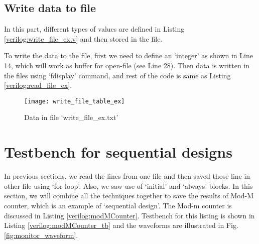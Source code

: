 \subsection{Write data to file}

In this part, different types of values are defined in Listing \ref{verilog:write_file_ex.v} and then stored in the file. 

\begin{explanation}
	To write the data to the file, first we need to define an `integer' as shown in Line 14, which will work as buffer for open-file (see Line 28). Then data is written in the files using `fdisplay' command, and rest of the code is same as Listing  \ref{verilog:read_file_ex}.  
\end{explanation}
%
%


%
\begin{figure}[!h]
	\centering
	\texttt{[image: write\_file\_table\_ex]}
	\caption{Data in file  `write\_file\_ex.txt'}
	\label{fig:write_file_table_ex}
\end{figure}

\section{Testbench for sequential designs}
In previous sections, we read the lines from one file and then saved those line in other file using `for loop'. Also, we saw use of `initial' and `always' blocks. In this section, we will combine all the techniques together to save the results of Mod-M counter, which is an example of `sequential design'. The Mod-m counter is discussed in Listing \ref{verilog:modMCounter}. Testbench for this listing is shown in Listing \ref{verilog:modMCounter_tb} and the waveforms are illustrated in Fig. \ref{fig:monitor_waveform}.

